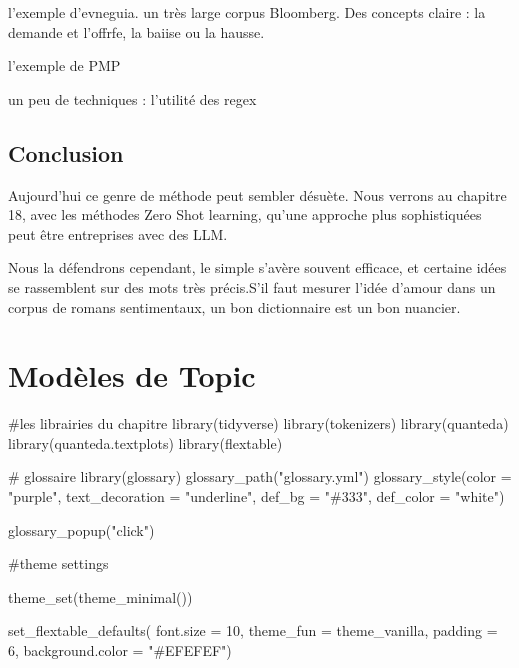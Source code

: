 \documentclass[
  letterpaper,
  DIV=11,
  numbers=noendperiod]{scrreprt}
\newenvironment{Shaded}{\begin{snugshade}}{\end{snugshade}}
\newcommand{\AttributeTok}[1]{\textcolor[rgb]{0.40,0.45,0.13}{#1}}
\newcommand{\CommentTok}[1]{\textcolor[rgb]{0.37,0.37,0.37}{#1}}
\newcommand{\DecValTok}[1]{\textcolor[rgb]{0.68,0.00,0.00}{#1}}
\newcommand{\FunctionTok}[1]{\textcolor[rgb]{0.28,0.35,0.67}{#1}}
\newcommand{\NormalTok}[1]{\textcolor[rgb]{0.00,0.23,0.31}{#1}}
\newcommand{\StringTok}[1]{\textcolor[rgb]{0.13,0.47,0.30}{#1}}
\begin{document}
l'exemple d'evneguia. un très large corpus Bloomberg. Des concepts
claire : la demande et l'offrfe, la baiise ou la hausse.

l'exemple de PMP

un peu de techniques : l'utilité des regex

\section{Conclusion}\label{conclusion-8}

Aujourd'hui ce genre de méthode peut sembler désuète. Nous verrons au
chapitre 18, avec les méthodes Zero Shot learning, qu'une approche plus
sophistiquées peut être entreprises avec des LLM.

Nous la défendrons cependant, le simple s'avère souvent efficace, et
certaine idées se rassemblent sur des mots très précis.S'il faut mesurer
l'idée d'amour dans un corpus de romans sentimentaux, un bon
dictionnaire est un bon nuancier.


\chapter{Modèles de Topic}\label{moduxe8les-de-topic}

\begin{Shaded}
\begin{Highlighting}[]
\CommentTok{\#les librairies du chapitre}
\FunctionTok{library}\NormalTok{(tidyverse)}
\FunctionTok{library}\NormalTok{(tokenizers)}
\FunctionTok{library}\NormalTok{(quanteda)}
\FunctionTok{library}\NormalTok{(quanteda.textplots)}
\FunctionTok{library}\NormalTok{(flextable)}

\CommentTok{\# glossaire}
\FunctionTok{library}\NormalTok{(glossary)}
\FunctionTok{glossary\_path}\NormalTok{(}\StringTok{"glossary.yml"}\NormalTok{)}
\FunctionTok{glossary\_style}\NormalTok{(}\AttributeTok{color =} \StringTok{"purple"}\NormalTok{, }
               \AttributeTok{text\_decoration =} \StringTok{"underline"}\NormalTok{,}
               \AttributeTok{def\_bg =} \StringTok{"\#333"}\NormalTok{,}
               \AttributeTok{def\_color =} \StringTok{"white"}\NormalTok{)}
\end{Highlighting}
\end{Shaded}

\begin{Shaded}
\begin{Highlighting}[]
\FunctionTok{glossary\_popup}\NormalTok{(}\StringTok{"click"}\NormalTok{)}

\CommentTok{\#theme settings}

\FunctionTok{theme\_set}\NormalTok{(}\FunctionTok{theme\_minimal}\NormalTok{()) }

\FunctionTok{set\_flextable\_defaults}\NormalTok{(}
  \AttributeTok{font.size =} \DecValTok{10}\NormalTok{, }\AttributeTok{theme\_fun =}\NormalTok{ theme\_vanilla,}
  \AttributeTok{padding =} \DecValTok{6}\NormalTok{,}
  \AttributeTok{background.color =} \StringTok{"\#EFEFEF"}\NormalTok{)}
\end{Highlighting}
\end{Shaded}
\end{document}
